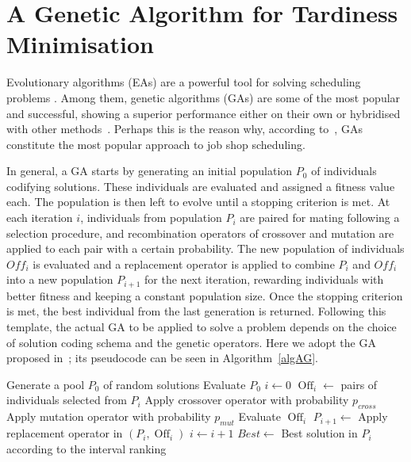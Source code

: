 \documentclass[12pt,halfline,a4paper]{ouparticle}
\begin{document}
\section{A Genetic Algorithm for Tardiness Minimisation}\label{secGA}
Evolutionary algorithms (EAs) are a powerful tool for solving scheduling problems \cite{Harrabi2020,Liqat2017}. Among them, genetic algorithms (GAs) are some of the most popular and successful, showing a superior performance either on their own or hybridised with other methods~\cite{Katoch2021}.  Perhaps this is the reason why, according to~\cite{Calis2015}, GAs constitute the most popular approach to job shop scheduling. 

In general, a GA starts by generating an initial  population $P_0$ of individuals codifying solutions. These individuals are evaluated and assigned a fitness value each. The population is then left to evolve until a stopping criterion is met. At each iteration $i$, individuals from population $P_i$ are paired for mating following a selection procedure, and recombination operators of crossover and mutation are applied to each pair with a certain probability. The new population of individuals $O\!f\!f_i$ is evaluated and a replacement operator is applied to combine $P_i$ and $O\!f\!f_i$ into a new population $P_{i+1}$ for the next iteration, rewarding individuals with better fitness and keeping a constant population size. Once the stopping criterion is met, the best individual from the last generation is returned.  Following this template, the actual GA to be applied to solve a problem depends on the choice of solution coding schema and the genetic operators.  Here we adopt the GA proposed in~\cite{Diaz2020}; its pseudocode can be seen in Algorithm~\ref{algAG}.

\begin{algorithm}[tb]
\small
\caption{\label{algAG} Schema of the Genetic Algorithm}
\begin{center}
\begin{algorithmic}
	\STATE Generate a pool $P_0$ of random solutions
	\STATE Evaluate $P_0$
	\STATE $i \leftarrow 0$
		\STATE $\operatorname{Off}_i \leftarrow $ pairs of individuals selected from $P_{i}$
       		\STATE Apply crossover operator with probability $p_{cross}$
			\STATE Apply mutation operator with probability $p_{mut}$
		\ENDFOR
		\STATE Evaluate $\operatorname{Off}_i$
		\STATE $P_{i+1} \leftarrow $ Apply replacement operator in $(P_i,\operatorname{Off}_i)$
		\STATE $i \leftarrow i+1$
	\ENDWHILE
	\STATE $Best \leftarrow $ Best solution in $P_i$ according to the interval ranking
\end{algorithmic}
\end{center}
\end{algorithm}
\end{document}
